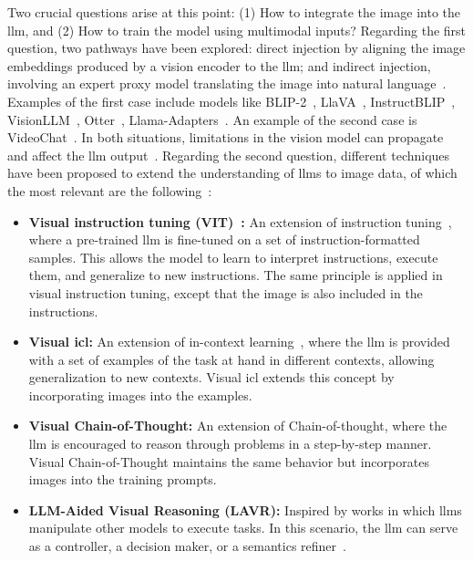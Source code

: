 Two crucial questions arise at this point: (1) How to integrate the image into the \gls{llm}, and (2) How to train the model using multimodal inputs? Regarding the first question, two pathways have been explored: direct injection by aligning the image embeddings produced by a vision encoder to the \gls{llm}; and indirect injection, involving an expert proxy model translating the image into natural language~\cite{yin2023survey}. Examples of the first case include models like BLIP-2~\cite{li2023blip2}, LlaVA~\cite{liu2023visual}, InstructBLIP~\cite{dai2023instructblip}, VisionLLM~\cite{wang2023visionllm}, Otter~\cite{li2023otter}, Llama-Adapters~\cite{gao2023llamaadapter,zhang2023llamaadapter}. An example of the second case is VideoChat~\cite{li2024videochat}. In both situations, limitations in the vision model can propagate and affect the \gls{llm} output~\cite{tong2024eyes}. Regarding the second question, different techniques have been proposed to extend the understanding of \glspl{llm} to image data, of which the most relevant are the following~\cite{yin2023survey}:

\begin{itemize}
    \item \textbf{Visual instruction tuning (VIT)~\cite{liu2023visual}:} An extension of instruction tuning~\cite{wei2021finetuned}, where a pre-trained \gls{llm} is fine-tuned on a set of instruction-formatted samples. This allows the model to learn to interpret instructions, execute them, and generalize to new instructions. The same principle is applied in visual instruction tuning, except that the image is also included in the instructions. 
    
    \item \textbf{ Visual \gls{icl}:} An extension of in-context learning~\cite{dong2022survey}, where the \gls{llm} is provided with a set of examples of the task at hand in different contexts, allowing generalization to new contexts. Visual \gls{icl} extends this concept by incorporating images into the examples.
    
    \item \textbf{Visual Chain-of-Thought:} An extension of Chain-of-thought, where the \gls{llm} is encouraged to reason through problems in a step-by-step manner. Visual Chain-of-Thought maintains the same behavior but incorporates images into the training prompts.
    
    \item \textbf{LLM-Aided Visual Reasoning (LAVR):} Inspired by works in which \glspl{llm} manipulate other models to execute tasks. In this scenario, the \gls{llm} can serve as a controller, a decision maker, or a semantics refiner~\cite{yin2023survey}.
\end{itemize}





